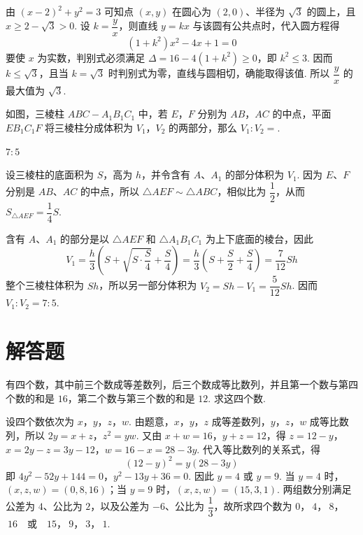 \documentclass[UTF8,a4paper,oneside,11pt]{ctexbook}
\begin{document}
\begin{solution}
由 \((x-2)^2+y^2=3\) 可知点 \((x,y)\) 在圆心为 \((2,0)\)、半径为 \(\sqrt3\) 的圆上，且 \(x\ge2-\sqrt3>0\). 设 \(k=\dfrac yx\)，则直线 \(y=kx\) 与该圆有公共点时，代入圆方程得
\[
(1+k^2)x^2-4x+1=0
\]
要使 \(x\) 为实数，判别式必须满足 \(\Delta=16-4(1+k^2)\ge0\)，即 \(k^2\le3\). 因而 \(k\le\sqrt3\)，且当 \(k=\sqrt3\) 时判别式为零，直线与圆相切，确能取得该值. 所以 \(\dfrac yx\) 的最大值为 \(\sqrt3\).
\end{solution}


\begin{problem}
如图，三棱柱 \(ABC-A_1B_1C_1\) 中，若 \(E\)，\(F\) 分别为 \(AB\)，\(AC\) 的中点，平面 \(EB_1C_1F\) 将三棱柱分成体积为 \(V_1\)，\(V_2\) 的两部分，那么 \(V_1:V_2=\)\fillinblank{}.

\end{problem}

\begin{answer}\(7:5\)\end{answer}

\begin{solution}
设三棱柱的底面积为 \(S\)，高为 \(h\)，并令含有 \(A\)、\(A_1\) 的部分体积为 \(V_1\). 因为 \(E\)、\(F\) 分别是 \(AB\)、\(AC\) 的中点，所以 \(\triangle AEF\sim\triangle ABC\)，相似比为 \(\dfrac12\)，从而 \(S_{\triangle AEF}=\dfrac14S\).

含有 \(A\)、\(A_1\) 的部分是以 \(\triangle AEF\) 和 \(\triangle A_1B_1C_1\) 为上下底面的棱台，因此
\[
V_1=\frac h3\left(S+\sqrt{S\cdot\frac S4}+\frac S4\right)=\frac h3\left(S+\frac S2+\frac S4\right)=\frac7{12}Sh
\]
整个三棱柱体积为 \(Sh\)，所以另一部分体积为 \(V_2=Sh-V_1=\dfrac5{12}Sh\). 因而 \(V_1:V_2=7:5\).
\end{solution}


\section{解答题}

\begin{problem}
有四个数，其中前三个数成等差数列，后三个数成等比数列，并且第一个数与第四个数的和是 \(16\)，第二个数与第三个数的和是 \(12\). 求这四个数.
\end{problem}

\begin{solution}
设四个数依次为 \(x\)，\(y\)，\(z\)，\(w\). 由题意，\(x\)，\(y\)，\(z\) 成等差数列，\(y\)，\(z\)，\(w\) 成等比数列，所以
\(2y=x+z\)，\(z^2=yw\).
又由 \(x+w=16\)，\(y+z=12\)，得 \(z=12-y\)，\(x=2y-z=3y-12\)，\(w=16-x=28-3y\). 代入等比数列的关系式，得
\[
(12-y)^2=y(28-3y)
\]
即
\(4y^2-52y+144=0\)，\(y^2-13y+36=0\).
因此 \(y=4\) 或 \(y=9\). 当 \(y=4\) 时，\((x,z,w)=(0,8,16)\)；当 \(y=9\) 时，\((x,z,w)=(15,3,1)\). 两组数分别满足公差为 \(4\)、公比为 \(2\)，以及公差为 \(-6\)、公比为 \(\dfrac{1}{3}\)，故所求四个数为
\(0\)，\(\ 4\)，\(\ 8\)，\(\ 16\quad\text{或}\quad 15\)，\(\ 9\)，\(\ 3\)，\(\ 1\).
\end{solution}
\end{document}
